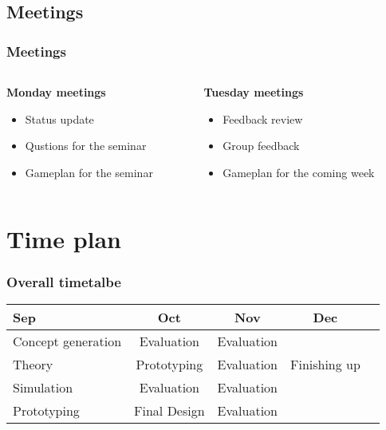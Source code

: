 \documentclass{beamer}
\begin{document}
\begin{frame}
    \subsection{Meetings}
    \frametitle{Meetings}
    \begin{columns}

        \begin{column}[]{0.5\textwidth}
            \textbf{Monday meetings}
            \begin{itemize}
                \item Status update
                \item Qustions for the seminar
                \item Gameplan for the seminar
            \end{itemize}
        \end{column}

        \begin{column}[]{.5\textwidth}
            \textbf{Tuesday meetings}
            \begin{itemize}
                \item Feedback review
                \item Group feedback
                \item Gameplan for the coming week
            \end{itemize}
        \end{column}

    \end{columns}
\end{frame}

\section{Time plan}
\begin{frame}
    \frametitle{Overall timetalbe}
    \begin{table}
        \begin{tabular}{| l | c | c | c | c }
            
            Sep & Oct & Nov & Dec \\
            \hline \hline
            Concept generation & Evaluation & Evaluation &  \\ 
            \hline
            Theory & Prototyping & Evaluation & Finishing up \\
            \hline
            Simulation & Evaluation & Evaluation & \\
            \hline
            Prototyping & Final Design & Evaluation &  \\
            \hline
 
        \end{tabular}
    \end{table}    
\end{frame}
\end{document}
